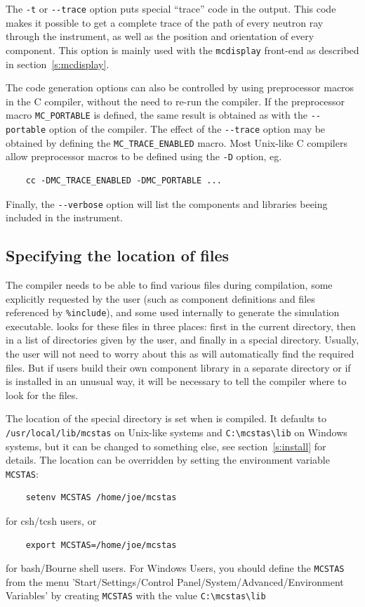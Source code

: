 The \verb+-t+ or \verb+--trace+ option puts special ``trace'' code in
the output. This code makes it possible to get a complete trace of the
path of every neutron ray through the instrument, as well as the position
and orientation of every component. This option is mainly used with the
\verb+mcdisplay+ front-end as described in section~\ref{s:mcdisplay}.

The code generation options can also be controlled by using preprocessor
macros in the C compiler, without the need to re-run the \MCS
compiler. If the preprocessor macro \verb+MC_PORTABLE+ is defined, the
same result is obtained as with the \verb+--portable+ option of the
\MCS compiler. The effect of the \verb+--trace+ option may be obtained
by defining the \verb+MC_TRACE_ENABLED+ macro. Most Unix-like C
compilers allow preprocessor macros to be defined using the \verb+-D+
option, eg.
\begin{lstlisting}
    cc -DMC_TRACE_ENABLED -DMC_PORTABLE ...
\end{lstlisting}
Finally, the \verb+--verbose+ option will list the components and libraries beeing
included in the instrument.

\subsection{Specifying the location of files}
\label{s:files}

The \MCS compiler needs to be able to find various files during
compilation, some explicitly requested by the user (such as component
definitions and files referenced by \verb+%include+), 
and some used internally to generate the simulation executable. \MCS looks for these
files in three places: first in the current directory, then in a list of
directories given by the user, and finally in a special \MCS
directory. Usually, the user will not need to worry about this as \MCS
will automatically find the required files. But if users build their own
component library in a separate directory or if \MCS is installed in an
unusual way, it will be necessary to tell the compiler where to look
for the files.

The location of the special \MCS directory is set when \MCS is
compiled. It defaults to \verb+/usr/local/lib/mcstas+ on Unix-like systems and \verb+C:\mcstas\lib+ on Windows systems, but it can be
changed to something else, see section~\ref{s:install} for
details. The location can be overridden by setting the environment
variable \verb+MCSTAS+: 
\begin{lstlisting}
    setenv MCSTAS /home/joe/mcstas
\end{lstlisting}
for csh/tcsh users, or
\begin{lstlisting}
    export MCSTAS=/home/joe/mcstas
\end{lstlisting}
for bash/Bourne shell users.
For Windows Users, you should define the \verb+MCSTAS+ from the menu 'Start/Settings/Control Panel/System/Advanced/Environment
Variables' by creating \verb+MCSTAS+ with the value \verb+C:\mcstas\lib+

